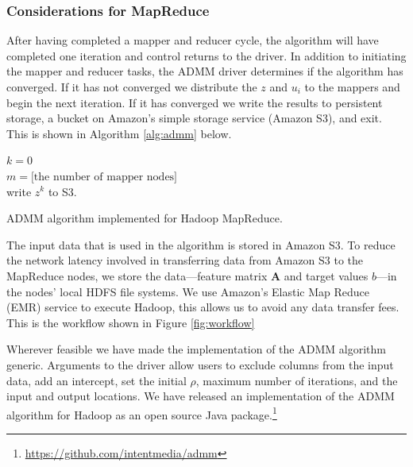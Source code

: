 \documentclass[10pt, conference, compsocconf]{IEEEtran}
\begin{document}
\subsubsection{Considerations for MapReduce}
After having completed a mapper and reducer cycle,  the algorithm will have completed one iteration and control returns to the driver.  In addition to initiating the mapper and reducer tasks, the ADMM driver determines if the algorithm has converged.  If it has not converged we distribute the $z$ and $u_i$ to the mappers and begin the next iteration.  If it has converged we write the results to persistent storage, a bucket on Amazon's simple storage service (Amazon S3), and exit.  This is shown in Algorithm \ref{alg:admm} below.

\begin{algorithm}
\SetAlgoLined
{}
$k=0$\\
$m=\text{[the number of mapper nodes]}$\\
write $z^k$ to S3.
\label{alg:admm}
\vspace{1em}
\caption{ADMM algorithm implemented for Hadoop MapReduce.}
\end{algorithm}

The input data that is used in the algorithm is stored in Amazon S3.  To reduce the network latency involved in transferring data from Amazon S3 to the MapReduce nodes, we store the data---feature matrix $\mathbf{A}$ and target values $b$---in the nodes' local HDFS file systems.  We use Amazon's Elastic Map Reduce (EMR) service to execute Hadoop, this allows us to avoid any data transfer fees.  This is the workflow shown in Figure \ref{fig:workflow}

Wherever feasible we have made the implementation of the ADMM algorithm generic.  Arguments to the driver allow users to exclude columns from the input data, add an intercept, set the initial $\rho$, maximum number of iterations, and the input and output locations. We have released an implementation of the ADMM algorithm for Hadoop as an open source Java package.\footnote{\url{https://github.com/intentmedia/admm}}
\end{document}
